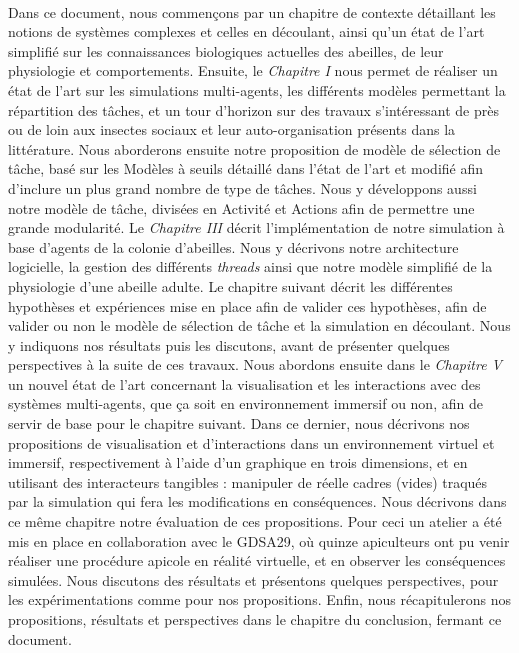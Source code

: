 	\paragraph{}
	Dans ce document, nous commençons par un chapitre de contexte détaillant les notions de systèmes complexes et celles en découlant, ainsi qu'un état de l'art simplifié sur les connaissances biologiques actuelles des abeilles, de leur physiologie et comportements.
	 Ensuite, le \textit{Chapitre I} nous permet de réaliser un état de l'art sur les simulations multi-agents, les différents modèles permettant la répartition des tâches, et un tour d'horizon sur des travaux s'intéressant de près ou de loin aux insectes sociaux et leur auto-organisation présents dans la littérature. 
	 Nous aborderons ensuite notre proposition de modèle de sélection de tâche, basé sur les Modèles à seuils détaillé dans l'état de l'art et modifié afin d'inclure un plus grand nombre de type de tâches. Nous y développons aussi notre modèle de tâche, divisées en Activité et Actions afin de permettre une grande modularité. 
	 Le \textit{Chapitre III} décrit l'implémentation de notre simulation à base d'agents de la colonie d'abeilles. Nous y décrivons notre architecture logicielle, la gestion des différents \textit{threads} ainsi que notre modèle simplifié de la physiologie d'une abeille adulte. 
	 Le chapitre suivant décrit les différentes hypothèses et expériences mise en place afin de valider ces hypothèses, afin de valider ou non le modèle de sélection de tâche et la simulation en découlant. Nous y indiquons nos résultats puis les discutons, avant de présenter quelques perspectives à la suite de ces travaux. 
	 Nous abordons ensuite dans le \textit{Chapitre V} un nouvel état de l'art concernant la visualisation et les interactions avec des systèmes multi-agents, que ça soit en environnement immersif ou non, afin de servir de base pour le chapitre suivant. 
	 Dans ce dernier, nous décrivons nos propositions de visualisation et d'interactions dans un environnement virtuel et immersif, respectivement à l'aide d'un graphique en trois dimensions, et en utilisant des interacteurs tangibles : manipuler de réelle cadres (vides) traqués par la simulation qui fera les modifications en conséquences. Nous décrivons dans ce même chapitre notre évaluation de ces propositions. Pour ceci un atelier a été mis en place en collaboration avec le GDSA29, où quinze apiculteurs ont pu venir réaliser une procédure apicole en réalité virtuelle, et en observer les conséquences simulées. Nous discutons des résultats et présentons quelques perspectives, pour les expérimentations comme pour nos propositions. 
	 Enfin, nous récapitulerons nos propositions, résultats et perspectives dans le chapitre du conclusion, fermant ce document.